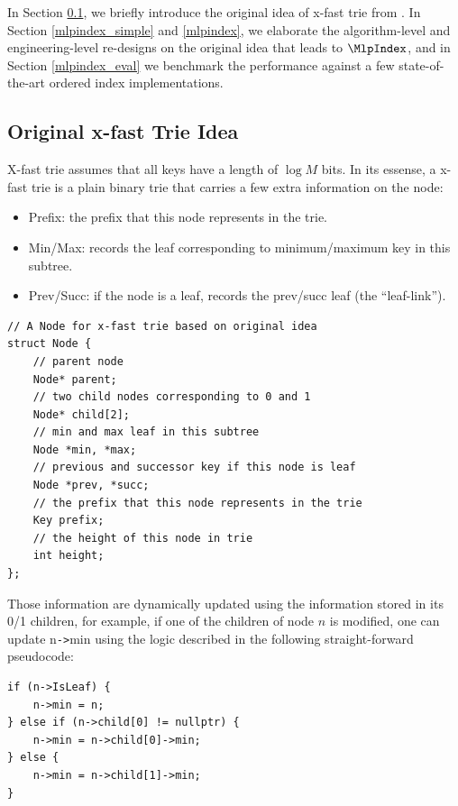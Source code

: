 \documentclass[11pt, usletter]{article}
\begin{document}
In Section \ref{intro_xfast}, we briefly introduce the original idea of x-fast trie from \cite{xfast}. 
In Section \ref{mlpindex_simple} and \ref{mlpindex}, 
we elaborate the algorithm-level and engineering-level re-designs on the original idea that leads to $\MlpIndex$, 
and in Section \ref{mlpindex_eval} we benchmark the performance against a few state-of-the-art ordered index implementations. 

\subsection{Original x-fast Trie Idea} \label{intro_xfast}

X-fast trie assumes that all keys have a length of $\log M$ bits.
In its essense, a x-fast trie is a plain binary trie that carries a few extra information on the node:
\begin{itemize}
[topsep=0pt,partopsep=0pt,itemsep=0pt,parsep=0pt,fullwidth,itemindent=\parindent,listparindent=\parindent]
\item Prefix: the prefix that this node represents in the trie.
\item Min/Max: records the leaf corresponding to minimum/maximum key in this subtree.
\item Prev/Succ: if the node is a leaf, records the prev/succ leaf (the ``leaf-link'').
\end{itemize}

\singlespacing\begin{codebox}
\begin{verbatim}
// A Node for x-fast trie based on original idea
struct Node {
    // parent node
    Node* parent;
    // two child nodes corresponding to 0 and 1
    Node* child[2];
    // min and max leaf in this subtree
    Node *min, *max;
    // previous and successor key if this node is leaf
    Node *prev, *succ;
    // the prefix that this node represents in the trie
    Key prefix;
    // the height of this node in trie
    int height;
};
\end{verbatim}
\end{codebox}\doublespacing

Those information are dynamically updated using the information stored in its 0/1 children, 
for example, if one of the children of node $n$ is modified, one can update n\verb|->|min
using the logic described in the following straight-forward pseudocode:

\singlespacing\begin{codebox}
\begin{verbatim}
if (n->IsLeaf) {
    n->min = n;
} else if (n->child[0] != nullptr) {
    n->min = n->child[0]->min;
} else {
    n->min = n->child[1]->min;
}
\end{verbatim}
\end{codebox}\doublespacing
\end{document}
